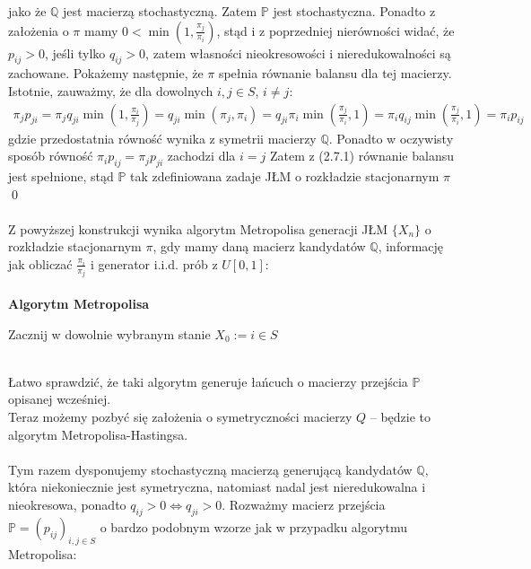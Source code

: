 \documentclass[a4paper]{article}
\begin{document}
jako że $\mathbb{Q}$ jest macierzą stochastyczną. Zatem $\mathbb{P}$ jest stochastyczna. Ponadto z założenia o $\pi$ mamy $0 < \min(1, \frac{\pi_j}{\pi_i})$, stąd i z poprzedniej nierówności widać, że $p_{ij} > 0$, jeśli tylko $q_{ij} > 0$, zatem własności nieokresowości i nieredukowalności są zachowane.  Pokażemy następnie, że $\pi$ spełnia równanie balansu dla tej macierzy. Istotnie, zauważmy, że dla dowolnych $i,j \in S$, $i \neq j$:
\begin{align*}
    \pi_j p_{ji} = \pi_j q_{ji} \min(1, \frac{\pi_i}{\pi_j}) =  q_{ji} \min(\pi_j, \pi_i) = q_{ji} \pi_i \min(\frac{\pi_j}{\pi_i}, 1) =  \pi_i q_{ij} \min(\frac{\pi_j}{\pi_i}, 1) = \pi_i p_{ij}
\end{align*}
gdzie przedostatnia równość wynika z symetrii macierzy $\mathbb{Q}$. Ponadto w oczywisty sposób równość $\pi_i p_{ij} = \pi_j p_{ji}$ zachodzi dla $i = j$ Zatem z (2.7.1) równanie balansu jest spełnione, stąd $\mathbb{P}$ tak zdefiniowana zadaje JŁM o rozkładzie stacjonarnym $\pi$ \qed
\\
\\
Z powyższej konstrukcji wynika algorytm Metropolisa generacji JŁM $\{X_n\}$ o rozkładzie stacjonarnym $\pi$, gdy mamy daną macierz kandydatów $\mathbb{Q}$, informację jak obliczać $\frac{\pi_i}{\pi_j}$ i generator  i.i.d. prób z $U[0,1]$:\\\\
\textbf{Algorytm Metropolisa}
\begin{algorithm}
Zacznij w dowolnie wybranym stanie $X_0 := i \in S$\\
\end{algorithm}
\\
Łatwo sprawdzić, że taki algorytm generuje łańcuch o macierzy przejścia $\mathbb{P}$ opisanej wcześniej.\\
Teraz możemy pozbyć się założenia o symetryczności macierzy $Q$ – będzie to algorytm Metropolisa-Hastingsa.\\
\\
Tym razem dysponujemy stochastyczną macierzą generującą kandydatów $\mathbb{Q}$, która niekoniecznie jest symetryczna, natomiast nadal jest nieredukowalna i nieokresowa, ponadto $q_{ij} > 0 \iff q_{ji} > 0$. Rozważmy macierz przejścia $\mathbb{P} = (p_{ij})_{i,j \in S}$ o bardzo podobnym wzorze jak w przypadku algorytmu Metropolisa:
\end{document}
